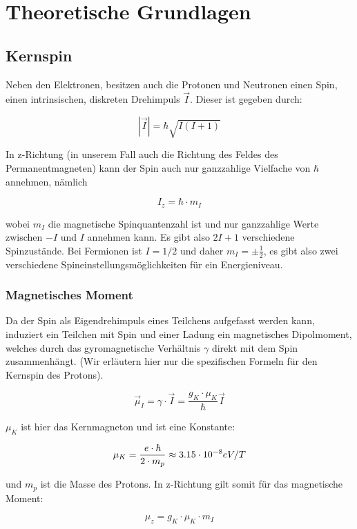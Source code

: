 \section{Theoretische Grundlagen}

\subsection{Kernspin}

Neben den Elektronen, besitzen auch die Protonen und Neutronen einen Spin, einen intrinsischen, diskreten Drehimpuls $\vec I$. Dieser ist gegeben durch:

$$ |\vec I| = \hbar \sqrt{I(I+1)} $$

In z-Richtung (in unserem Fall auch die Richtung des Feldes des Permanentmagneten) kann der Spin auch nur ganzzahlige Vielfache von $\hbar$ annehmen, nämlich

$$I_z = \hbar\cdot m_I$$

wobei $m_I$ die magnetische Spinquantenzahl ist und nur ganzzahlige Werte zwischen $-I$ und $I$ annehmen kann. Es gibt also $2I+1$ verschiedene Spinzustände. Bei Fermionen ist $I=1/2$ und daher $m_I = \pm\frac{1}{2}$, es gibt also zwei verschiedene Spineinstellungsmöglichkeiten für ein Energieniveau.

\subsubsection{Magnetisches Moment}

Da der Spin als Eigendrehimpuls eines Teilchens aufgefasst werden kann, induziert ein Teilchen mit Spin und einer Ladung ein magnetisches Dipolmoment, welches durch das gyromagnetische Verhältnis $\gamma$ direkt mit dem Spin zusammenhängt. (Wir erläutern hier nur die spezifischen Formeln für den Kernspin des Protons).

\begin{equation} \vec \mu_I = \gamma\cdot\vec I = \frac{g_K\cdot\mu_K}{\hbar}\vec I \label{gyro}\end{equation}

$\mu_K$ ist hier das Kernmagneton und ist eine Konstante:

$$\mu_K = \frac{e\cdot \hbar}{2\cdot m_p} \approx 3.15\cdot 10^{-8} eV/T$$

und $m_p$ ist die Masse des Protons. In z-Richtung gilt somit für das magnetische Moment:

\begin{equation} \mu_z = g_K \cdot \mu_K \cdot m_I \label{muz} \end{equation}

